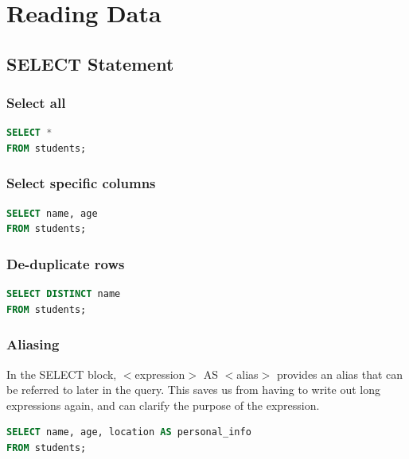 \documentclass{article}
\begin{document}
\newpage
\section{Reading Data}
\subsection{SELECT Statement}
\subsubsection{Select all}

\vspace{8pt}
\begin{lstlisting}[language=SQL]
SELECT *
FROM students;
\end{lstlisting} \vspace{8pt}

\subsubsection{Select specific columns}
\vspace{8pt} \begin{lstlisting}[language=SQL]
SELECT name, age
FROM students;
\end{lstlisting} \vspace{8pt}

\subsubsection{De-duplicate rows}

\vspace{8pt} \begin{lstlisting}[language=SQL]
SELECT DISTINCT name
FROM students;
\end{lstlisting} \vspace{8pt}


\subsubsection{Aliasing}

In the SELECT block, $<$expression$>$ AS $<$alias$>$ provides an alias that can be referred to later in the query. This saves us from having to write out long expressions again, and can clarify the purpose of the expression.

\vspace{8pt} \begin{lstlisting}[language=SQL]
SELECT name, age, location AS personal_info
FROM students;
\end{lstlisting}
\end{document}
